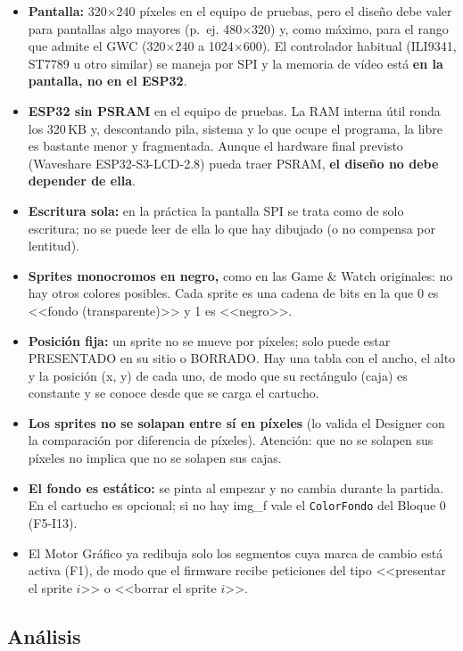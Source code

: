 \begin{itemize}
	\item \textbf{Pantalla:} 320$\times$240 píxeles en el equipo de pruebas, pero el diseño debe valer para pantallas algo mayores (p.~ej. 480$\times$320) y, como máximo, para el rango que admite el GWC (320$\times$240 a 1024$\times$600). El controlador habitual (ILI9341, ST7789 u otro similar) se maneja por SPI y la memoria de vídeo está \textbf{en la pantalla, no en el ESP32}.
	\item \textbf{ESP32 sin PSRAM} en el equipo de pruebas. La RAM interna útil ronda los 320\,KB y, descontando pila, sistema y lo que ocupe el programa, la libre es bastante menor y fragmentada. Aunque el hardware final previsto (Waveshare ESP32-S3-LCD-2.8) pueda traer PSRAM, \textbf{el diseño no debe depender de ella}.
	\item \textbf{Escritura sola:} en la práctica la pantalla SPI se trata como de solo escritura; no se puede leer de ella lo que hay dibujado (o no compensa por lentitud).
	\item \textbf{Sprites monocromos en negro,} como en las Game \& Watch originales: no hay otros colores posibles. Cada sprite es una cadena de bits en la que 0 es <<fondo (transparente)>> y 1 es <<negro>>.
	\item \textbf{Posición fija:} un sprite no se mueve por píxeles; solo puede estar PRESENTADO en su sitio o BORRADO. Hay una tabla con el ancho, el alto y la posición (x, y) de cada uno, de modo que su rectángulo (caja) es constante y se conoce desde que se carga el cartucho.
	\item \textbf{Los sprites no se solapan entre sí en píxeles} (lo valida el Designer con la comparación por diferencia de píxeles). Atención: que no se solapen sus píxeles no implica que no se solapen sus cajas.
	\item \textbf{El fondo es estático:} se pinta al empezar y no cambia durante la partida. En el cartucho es opcional; si no hay img\_f vale el \texttt{ColorFondo} del Bloque 0 (F5-I13).
	\item El Motor Gráfico ya redibuja solo los segmentos cuya marca de cambio está activa (F1), de modo que el firmware recibe peticiones del tipo <<presentar el sprite $i$>> o <<borrar el sprite $i$>>.
\end{itemize}

\subsection{Análisis}
\label{sec:F6I01Analisis}

